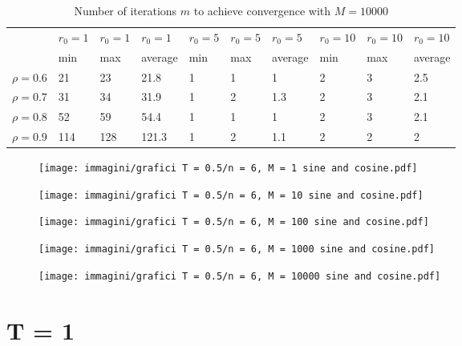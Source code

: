 \documentclass[a4paper,11pt,openright]{report}
\begin{document}
\begin{table}[H]
\centering
\addtolength{\leftskip}{-1.5cm}
\addtolength{\rightskip}{-1.5cm}
\begin{tabular}{|c|lllllllll|}
\hline
$ $ & $r_0 = 1$ & $r_0 = 1$ & $r_0 = 1$ & $r_0 = 5$ & $r_0 = 5$ & $r_0 = 5$ & $r_0 = 10$ & $r_0 = 10$ & $r_0 = 10$  \\
$ $ & min & max & average & min & max & average & min & max & average \\ 
\hline
$\rho = 0.6$ & 21 & 23 & 21.8 & 1 & 1 & 1 & 2 & 3 & 2.5\\

$\rho = 0.7$ & 31 & 34 & 31.9 & 1 & 2 & 1.3 & 2 & 3 & 2.1\\

$\rho = 0.8$ & 52 & 59 & 54.4 & 1 & 1 & 1 & 2 & 3 & 2.1\\

$\rho = 0.9$ & 114 & 128 & 121.3 & 1 & 2 & 1.1 & 2 & 2 & 2\\
\hline
\end{tabular}
\caption{Number of iterations $m$ to achieve convergence with $M = 10000$}
\end{table}
\begin{figure}[H]
\centering
\texttt{[image: immagini/grafici T = 0.5/n = 6, M = 1 sine and cosine.pdf]}
\end{figure}
\begin{figure}[H]
\centering
\texttt{[image: immagini/grafici T = 0.5/n = 6, M = 10 sine and cosine.pdf]}
\end{figure}
\begin{figure}[H]
\centering
\texttt{[image: immagini/grafici T = 0.5/n = 6, M = 100 sine and cosine.pdf]}
\end{figure}
\begin{figure}[H]
\centering
\texttt{[image: immagini/grafici T = 0.5/n = 6, M = 1000 sine and cosine.pdf]}
\end{figure}
\begin{figure}[H]
\centering
\texttt{[image: immagini/grafici T = 0.5/n = 6, M = 10000 sine and cosine.pdf]}
\end{figure}
\newpage
\section{T = 1}
\end{document}
